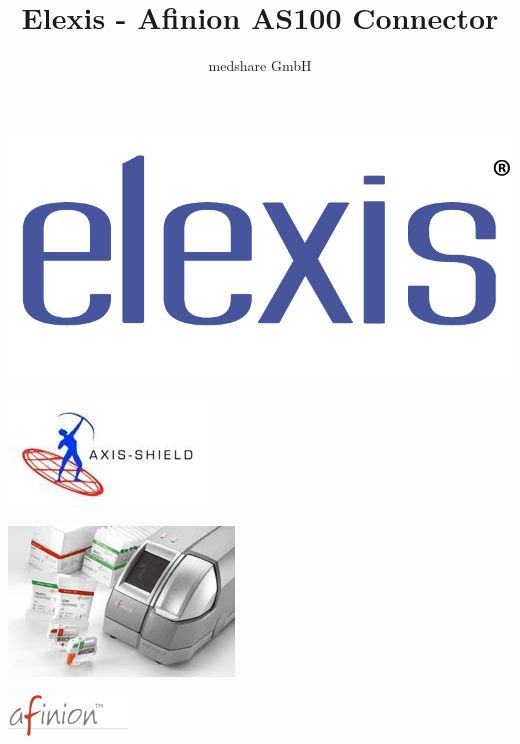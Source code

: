 \documentclass[a4paper]{scrartcl}
\title{Elexis - Afinion AS100 Connector}
\author{medshare GmbH}
\begin{document}
%
\maketitle
	\begin{center}
		\includegraphics{elexis_logo}
	\end{center}
	\begin{center}
		\includegraphics{axis-shield_logo}
	\end{center}
	\begin{center}
		\includegraphics{afinion_device}
	\end{center}
	\begin{center}
		\includegraphics{afinion_logo}
	\end{center}
\pagebreak
\end{document}
